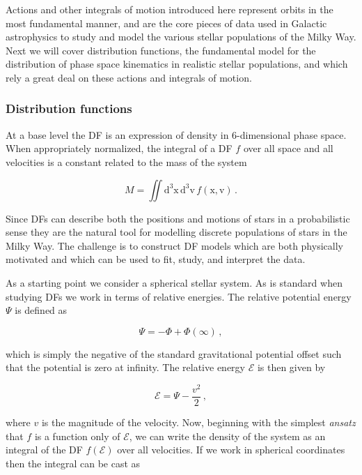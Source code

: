 Actions and other integrals of motion introduced here represent orbits in the most fundamental manner, and are the core pieces of data used in Galactic astrophysics to study and model the various stellar populations of the Milky Way. Next we will cover distribution functions, the fundamental model for the distribution of phase space kinematics in realistic stellar populations, and which rely a great deal on these actions and integrals of motion.

\subsubsection{Distribution functions}

At a base level the DF is an expression of density in 6-dimensional phase space. When appropriately normalized, the integral of a DF $f$ over all space and all velocities is a constant related to the mass of the system

\begin{equation}
    \label{ch1:eq:df-normalization}
    M = \iint \mathrm{d}^3\mathbf{\mathrm{x}}\, \mathrm{d}^3\mathbf{\mathrm{v}}\, f( \mathbf{\mathrm{x}}, \mathbf{\mathrm{v}}) \,.
\end{equation}

\noindent Since DFs can describe both the positions and motions of stars in a probabilistic sense they are the natural tool for modelling discrete populations of stars in the Milky Way. The challenge is to construct DF models which are both physically motivated and which can be used to fit, study, and interpret the data.

As a starting point we consider a spherical stellar system. As is standard when studying DFs we work in terms of relative energies. The relative potential energy $\Psi$ is defined as 

\begin{equation}
    \label{ch1:eq:relative-potential-energy}
    \Psi = -\Phi + \Phi(\infty)\,,
\end{equation}

\noindent which is simply the negative of the standard gravitational potential offset such that the potential is zero at infinity. The relative energy $\mathcal{E}$ is then given by

\begin{equation}
    \label{ch1:eq:relative-energy}
    \mathcal{E} = \Psi - \frac{v^{2}}{2}\,,
\end{equation}

\noindent where $v$ is the magnitude of the velocity. Now, beginning with the simplest \textit{ansatz} that $f$ is a function only of $\mathcal{E}$, we can write the density of the system as an integral of the DF $f(\mathcal{E})$ over all velocities. If we work in spherical coordinates then the integral can be cast as 

